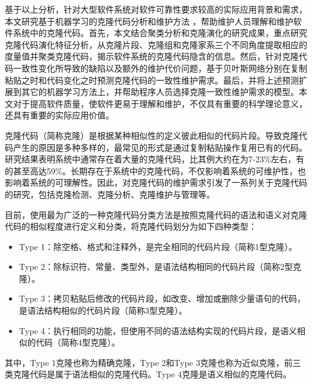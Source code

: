 基于以上分析，针对大型软件系统对软件可靠性要求较高的实际应用背景和需求，本文研究基于机器学习的克隆代码分析和维护方法 ，帮助维护人员理解和维护软件系统中的克隆代码。首先，本文结合聚类分析和克隆演化的研究成果，重点研究克隆代码演化特征分析，从克隆片段、克隆组和克隆家系三个不同角度提取相应的度量值并聚类克隆代码，揭示软件系统的克隆代码隐含的信息。然后，针对克隆代码一致性变化所导致的缺陷以及额外的维护代价问题，基于贝叶斯网络分别在复制粘贴之时和代码变化之时预测克隆代码的一致性维护需求。最后，并将上述预测扩展到其它的机器学习方法上，并帮助程序人员选择克隆一致性维护需求的模型。本文对于提高软件质量，使软件更易于理解和维护，不仅具有重要的科学理论意义，还具有重要的实际应用价值。



克隆代码（简称克隆）是根据某种相似性的定义彼此相似的代码片段\cite{koschke2007survey}。导致克隆代码产生的原因是多种多样的，最常见的形式是通过复制粘贴操作复用已有的代码。研究结果表明系统中通常存在着大量的克隆代码，比其例大约在为7-23\%左右，有的甚至高达59\%\cite{roy2007survey}。长期存在于系统中的克隆代码，不仅影响着系统的可维护性，也影响着系统的可理解性。因此，对克隆代码的维护需求引发了一系列关于克隆代码的研究，包括克隆检测、克隆分析、克隆维护与管理等。

目前，使用最为广泛的一种克隆代码分类方法是按照克隆代码的语法和语义对克隆代码的相似程度进行定义和分类，将克隆代码划分为如下四种类型：
\begin{itemize}
\item {Type 1：除空格、格式和注释外，是完全相同的代码片段（简称1型克隆）。}
\item {Type 2：除标识符、常量、类型外，是语法结构相同的代码片段（简称2型克隆）。}
\item {Type 3：拷贝粘贴后修改的代码片段，如改变、增加或删除少量语句的代码，是语法结构相似的代码片段（简称3型克隆）。}
\item {Type 4：执行相同的功能，但使用不同的语法结构实现的代码片段，是语义相似的代码（简称4型克隆）。}
\end{itemize}

其中，Type 1克隆也称为精确克隆，Type 2和Type 3克隆也称为近似克隆，前三类克隆代码是属于语法相似的克隆代码。Type 4克隆是语义相似的克隆代码。


